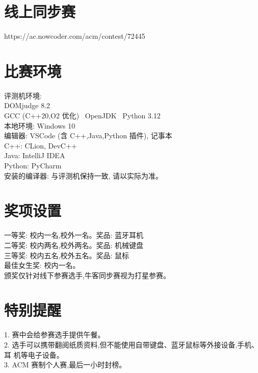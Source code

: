 \documentclass[12pt, a4paper, oneside]{ctexart}
\begin{document}
  \section{线上同步赛}
  https://ac.nowcoder.com/acm/contest/72445

  \section{比赛环境}
  评测机环境: \\
  DOMjudge 8.2\\
  GCC (C++20,O2 优化) \ OpenJDK \ Python 3.12\\
  本地环境: 
  Windows 10\\
  编辑器: VSCode (含 C++,Java,Python 插件), 记事本\\
  C++: CLion, DevC++\\
  Java: IntelliJ IDEA\\
  Python: PyCharm\\
  安装的编译器: 与评测机保持一致, 请以实际为准。
  \section{奖项设置}
  一等奖: 校内一名,校外一名。奖品: 蓝牙耳机\\
  二等奖: 校内两名,校外两名。奖品: 机械键盘\\
  三等奖: 校内五名,校外五名。奖品: 鼠标\\
  最佳女生奖: 校内一名。\\
  颁奖仅针对线下参赛选手,牛客同步赛视为打星参赛。
  \section{特别提醒}
  1. 赛中会给参赛选手提供午餐。\\
  2. 选手可以携带翻阅纸质资料,但不能使用自带键盘、蓝牙鼠标等外接设备,手机、耳
  机等电子设备。\\
  3. ACM 赛制个人赛,最后一小时封榜。
  





  \begin{figure}[b]
  \end{figure}
\end{document}
